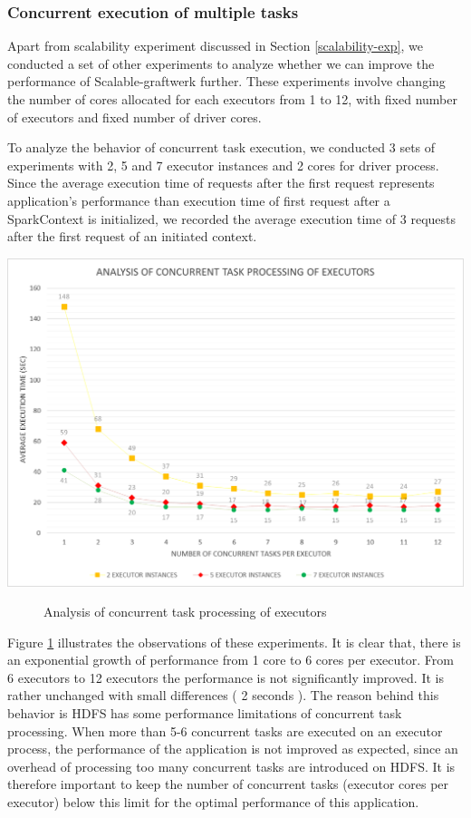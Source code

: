 \subsubsection{Concurrent execution of multiple tasks}
Apart from scalability experiment discussed in Section \ref{scalability-exp}, we conducted a set of other experiments to analyze whether we can  improve the performance of Scalable-graftwerk further. These experiments involve changing the number of cores allocated for each executors from 1 to 12, with fixed number of executors and fixed number of driver cores. 

To analyze the behavior of concurrent task execution, we conducted 3 sets of experiments with 2, 5  and 7 executor instances and 2 cores for driver process. Since the average execution time of requests after the first request represents application's performance than execution time of first request after a SparkContext is initialized, we recorded the average execution time of 3 requests after the first request of an initiated context.
\begin{center}
	\includegraphics[width=38em]{./Figures/executor-cores2}
	\begin{figure}[htbp]
    \caption{Analysis of concurrent task processing of executors}
    \label{fig:executor-cores}
	\end{figure}
\end{center}
Figure \ref{fig:executor-cores} illustrates the observations of these experiments.  It is clear that, there is an exponential growth of performance from 1 core to 6 cores per executor. From 6 executors to 12 executors the performance is not significantly improved. It is rather unchanged with small differences ( 2 seconds ). The reason behind this behavior is HDFS has some performance limitations of concurrent task processing. When more than 5-6 concurrent tasks are executed on an executor process, the performance of the application is not improved as expected, since an overhead of processing too many concurrent tasks are introduced on HDFS. It is therefore important to keep the number of concurrent tasks (executor cores per executor) below this limit for the optimal performance of this application.  

